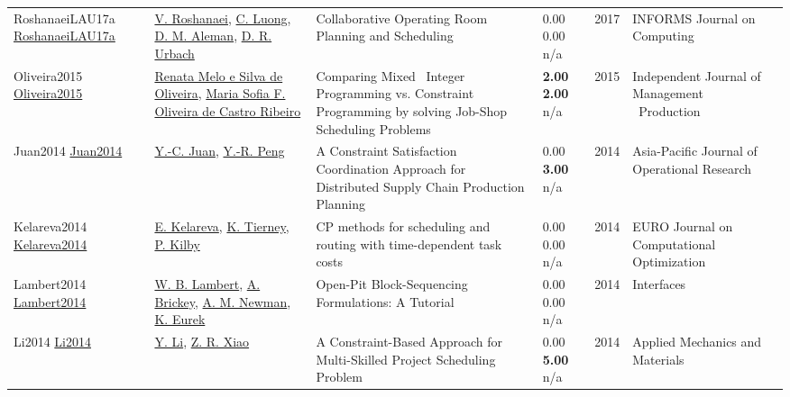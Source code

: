 {\begin{longtable}{p{3cm}p{5cm}p{10cm}p{1cm}rp{2.5cm}l}
RoshanaeiLAU17a \href{http://dx.doi.org/10.1287/ijoc.2017.0745}{RoshanaeiLAU17a} & \hyperref[auth:a727]{V. Roshanaei}, \hyperref[auth:a926]{C. Luong}, \hyperref[auth:a894]{D. M. Aleman}, \hyperref[auth:a895]{D. R. Urbach} & Collaborative Operating Room Planning and Scheduling & \noindent{}\textcolor{black!50}{0.00} \textcolor{black!50}{0.00} n/a & 2017 & \cellcolor{red!20}INFORMS Journal on Computing & \cite{RoshanaeiLAU17a}\\
Oliveira2015 \href{http://dx.doi.org/10.14807/ijmp.v6i1.262}{Oliveira2015} & \hyperref[auth:a1566]{Renata Melo e Silva de Oliveira}, \hyperref[auth:a1567]{Maria Sofia F. Oliveira de Castro Ribeiro} & Comparing Mixed \  Integer Programming vs. Constraint Programming by solving Job-Shop Scheduling Problems & \noindent{}\textbf{2.00} \textbf{2.00} n/a & 2015 & Independent Journal of Management \  Production & \cite{Oliveira2015}\\
Juan2014 \href{http://dx.doi.org/10.1142/s0217595914500419}{Juan2014} & \hyperref[auth:a1978]{Y.-C. Juan}, \hyperref[auth:a1979]{Y.-R. Peng} & A Constraint Satisfaction Coordination Approach for Distributed Supply Chain Production Planning & \noindent{}\textcolor{black!50}{0.00} \textbf{3.00} n/a & 2014 & Asia-Pacific Journal of Operational Research & \cite{Juan2014}\\
Kelareva2014 \href{http://dx.doi.org/10.1007/s13675-014-0022-7}{Kelareva2014} & \hyperref[auth:a332]{E. Kelareva}, \hyperref[auth:a333]{K. Tierney}, \hyperref[auth:a334]{P. Kilby} & \cellcolor{gold!20}CP methods for scheduling and routing with time-dependent task costs & \noindent{}\textcolor{black!50}{0.00} \textcolor{black!50}{0.00} n/a & 2014 & EURO Journal on Computational Optimization & \cite{Kelareva2014}\\
Lambert2014 \href{http://dx.doi.org/10.1287/inte.2013.0731}{Lambert2014} & \hyperref[auth:a1556]{W. B. Lambert}, \hyperref[auth:a1557]{A. Brickey}, \hyperref[auth:a1558]{A. M. Newman}, \hyperref[auth:a1559]{K. Eurek} & Open-Pit Block-Sequencing Formulations: A Tutorial & \noindent{}\textcolor{black!50}{0.00} \textcolor{black!50}{0.00} n/a & 2014 & \cellcolor{red!20}Interfaces & \cite{Lambert2014}\\
Li2014 \href{http://dx.doi.org/10.4028/www.scientific.net/amm.681.265}{Li2014} & \hyperref[auth:a1490]{Y. Li}, \hyperref[auth:a1491]{Z. R. Xiao} & A Constraint-Based Approach for Multi-Skilled Project Scheduling Problem & \noindent{}\textcolor{black!50}{0.00} \textbf{5.00} n/a & 2014 & Applied Mechanics and Materials & \cite{Li2014}\\

\end{longtable}}
